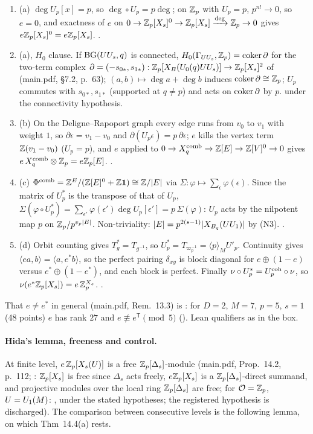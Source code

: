 \begin{outline}
\begin{enumerate}[label=\arabic*.]
\item (a) $\deg U_p[x]=p$, so $\deg\circ U_p=p\deg$; on $\mathbb{Z}_p$ with $U_p=p$, $p^{n!}\to0$, so $e=0$, and exactness of $e$ on
  $0\to\mathbb{Z}_p[X_s]^0\to\mathbb{Z}_p[X_s]\xrightarrow{\deg}\mathbb{Z}_p\to0$ gives $e\mathbb{Z}_p[X_s]^0=e\mathbb{Z}_p[X_s]$. \stproved.
\item (a), $H_0$ clause. If $\mathrm{BG}(UU_s,q)$ is connected, $H_0(\Gamma_{UU_s},\mathbb{Z}_p)=\operatorname{coker}\partial$ for the two-term complex
  $\partial=(-s_{0*},s_{1*}):\mathbb{Z}_p[X_B(U_0(q)UU_s)]\to\mathbb{Z}_p[X_s]^2$ of (main.pdf, \S7.2, p.~63); $(a,b)\mapsto\deg a+\deg b$ induces
  $\operatorname{coker}\partial\cong\mathbb{Z}_p$; $U_p$ commutes with $s_{0*},s_{1*}$ (supported at $q\ne p$) and acts on $\operatorname{coker}\partial$ by $p$. \stproved{}
  under the connectivity hypothesis.
\item (b) On the Deligne--Rapoport graph every edge runs from $v_0$ to $v_1$ with weight $1$, so $\partial\epsilon=v_1-v_0$ and
  $\partial(U_p\epsilon)=p\,\partial\epsilon$; $e$ kills the vertex term $\mathbb{Z}(v_1-v_0)$ ($U_p=p$), and $e$ applied to
  $0\to X^{\mathrm{comb}}_q\to\mathbb{Z}[E]\to\mathbb{Z}[V]^0\to0$ gives $e\,X^{\mathrm{comb}}_q\otimes\mathbb{Z}_p=e\mathbb{Z}_p[E]$. \stproved.
\item (c) $\Phi^{\mathrm{comb}}=\mathbb{Z}^E/(\mathbb{Z}[E]^0+\mathbb{Z}\mathbf1)\cong\mathbb{Z}/|E|$ via $\Sigma:\varphi\mapsto\sum_\epsilon\varphi(\epsilon)$. Since the matrix of
  $U_p^*$ is the transpose of that of $U_p$, $\Sigma(\varphi\circ U_p^*)=\sum_{\epsilon'}\varphi(\epsilon')\deg U_p[\epsilon']=p\,\Sigma(\varphi)$: $U_p$ acts by
  the nilpotent map $p$ on $\mathbb{Z}_p/p^{v_p|E|}$. Non-triviality: $|E|=p^{2(s-1)}|X_{B_q}(UU_1)|$ by (N3). \stproved.
\item (d) Orbit counting gives $T_g^*=T_{g^{-1}}$, so $U_p^*=T_{\varpi_p^{-1}}=\langle p\rangle_MU'_p$. Continuity gives
  $\langle ea,b\rangle=\langle a,e^*b\rangle$, so the perfect pairing $\delta_{xy}$ is block diagonal for
  $e\oplus(1-e)$ versus $e^*\oplus(1-e^*)$, and each block is perfect. Finally $\nu\circ U_p^*=U_p^{\rm coh}\circ\nu$, so
  $\nu(e^*\mathbb{Z}_p[X_s])=e\,\mathbb{Z}_p^{X_s}$. \stproved.
\end{enumerate}
That $e\ne e^*$ in general (main.pdf, Rem.~13.3) is \stcomp: for $D=2$, $M=7$, $p=5$, $s=1$ (48 points) $e$ has rank $27$ and
$e\not\equiv e^{\mathsf T}\pmod5$ (). Lean qualifiers as in the box.
\end{outline}

\paragraph{Hida's lemma, freeness and control.}
At finite level, $e\,\mathbb{Z}_p[X_s(U)]$ is a free $\mathbb{Z}_p[\Delta_s]$-module (main.pdf, Prop.~14.2, p.~112; \stproved: $\mathbb{Z}_p[X_s]$ is free since
$\Delta_s$ acts freely, $e\mathbb{Z}_p[X_s]$ is a $\mathbb{Z}_p[\Delta_s]$-direct summand, and projective modules over the local ring
$\mathbb{Z}_p[\Delta_s]$ are free; \stformal{} for $\mathcal{O}=\mathbb{Z}_p$, $U=U_1(M)$: , under the stated hypotheses; the registered hypothesis  is discharged). The
comparison between consecutive levels is the following lemma, on which Thm~14.4(a) rests.

